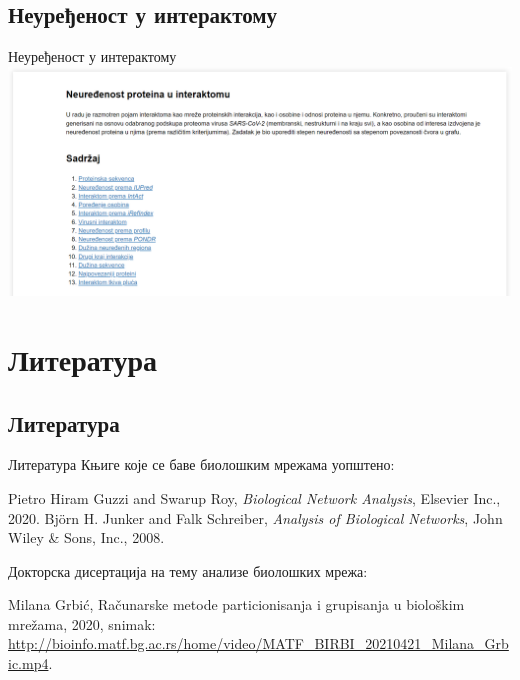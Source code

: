 \documentclass[hyperref={bookmarks=false}]{beamer}
\begin{document}
\subsection{Неуређеност у интерактому}
\begin{frame}{Неуређеност у интерактому}
\centering\includegraphics[width=\textwidth]{sveska.png}
\end{frame}


\section{Литература}
\subsection{Литература}
\begin{frame}{Литература}
Књиге које се баве биолошким мрежама уопштено:
\begin{thebibliography}{2}
\bibitem{} Pietro Hiram Guzzi and Swarup Roy, \textit{Biological Network Analysis}, Elsevier Inc., 2020.
\bibitem{} Björn H. Junker and Falk Schreiber, \textit{Analysis of Biological Networks}, John Wiley \& Sons, Inc., 2008.
\end{thebibliography}

\bigskip

Докторска дисертација на тему анализе биолошких мрежа:
\begin{thebibliography}{1}
\bibitem{} Milana Grbić, Računarske metode particionisanja i grupisanja u biološkim mrežama, 2020, snimak: \url{http://bioinfo.matf.bg.ac.rs/home/video/MATF_BIRBI_20210421_Milana_Grbic.mp4}.
\end{thebibliography}
\end{frame}
\end{document}
